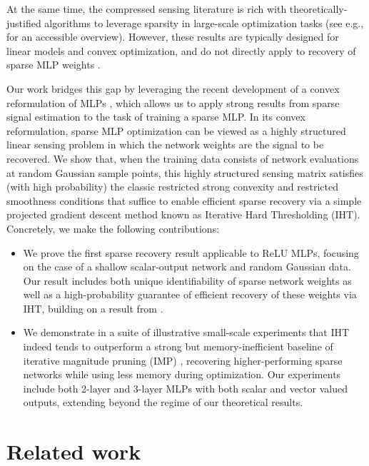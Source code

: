 \documentclass{article} %
\newcommand{\1}{\ensuremath{{\sf (i)}}}
\newcommand{\2}{\ensuremath{{\sf (ii)}}}
\newcommand{\3}{\ensuremath{{\sf (iii)}}}
\newcommand{\4}{\ensuremath{{\sf (iv)}}}
\newcommand{\5}{\ensuremath{{\sf (v)}}}
\newcommand{\6}{\ensuremath{{\sf (vi)}}}
\begin{document}
At the same time, the compressed sensing literature is rich with theoretically-justified algorithms to leverage sparsity in large-scale optimization tasks (see e.g., \citet{wright2022high} for an accessible overview). However, these results are typically designed for linear models and convex optimization, and do not directly apply to recovery of sparse MLP weights \citep{tropp2004greed, khanna2018iht, aghazadeh2018mission}.

Our work bridges this gap by leveraging the recent development of a convex reformulation of MLPs \citep{convexnn2layer, deepconvex}, which allows us to apply strong results from sparse signal estimation \citep{jain2014iterative} to the task of training a sparse MLP. In its convex reformulation, sparse MLP optimization can be viewed as a highly structured linear sensing problem in which the network weights are the signal to be recovered. We show that, when the training data consists of network evaluations at random Gaussian sample points, this highly structured sensing matrix satisfies (with high probability) the classic restricted strong convexity and restricted smoothness conditions that suffice to enable efficient sparse recovery via a simple projected gradient descent method known as Iterative Hard Thresholding (IHT).
Concretely, we make the following contributions:
\begin{itemize}
    \item We prove the first sparse recovery result applicable to ReLU MLPs, focusing on the case of a shallow scalar-output network and random Gaussian data. Our result includes both unique identifiability of sparse network weights as well as a high-probability guarantee of efficient recovery of these weights via IHT, building on a result from \citet{jain2014iterative}.
    \item We demonstrate in a suite of illustrative small-scale experiments that IHT indeed tends to outperform a strong but memory-inefficient baseline of iterative magnitude pruning (IMP) \citep{frankle2018lottery}, recovering higher-performing sparse networks while using less memory during optimization. Our experiments include both 2-layer and 3-layer MLPs with both scalar and vector valued outputs, extending beyond the regime of our theoretical results.
\end{itemize}



\section{Related work}
\label{sec:related}
\end{document}
